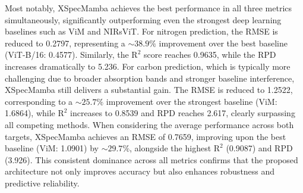 \documentclass[pdflatex,sn-mathphys-num]{sn-jnl}%
\begin{document}
Most notably, XSpecMamba achieves the best performance in all three metrics simultaneously, significantly outperforming even the strongest deep learning baselines such as ViM and NIRsViT. For nitrogen prediction, the RMSE is reduced to 0.2797, representing a $\sim38.9\%$ improvement over the best baseline (ViT-B/16: 0.4577). Similarly, the $\text{R}^2$ score reaches 0.9635, while the RPD increases dramatically to 5.236. For carbon prediction, which is typically more challenging due to broader absorption bands and stronger baseline interference, XSpecMamba still delivers a substantial gain. The RMSE is reduced to 1.2522, corresponding to a $\sim25.7\%$ improvement over the strongest baseline (ViM: 1.6864), while $\text{R}^2$ increases to 0.8539 and RPD reaches 2.617, clearly surpassing all competing methods. When considering the average performance across both targets, XSpecMamba achieves an RMSE of 0.7659, improving upon the best baseline (ViM: 1.0901) by $\sim29.7\%$, alongside the highest $\text{R}^2$ (0.9087) and RPD (3.926). This consistent dominance across all metrics confirms that the proposed architecture not only improves accuracy but also enhances robustness and predictive reliability.
\end{document}
